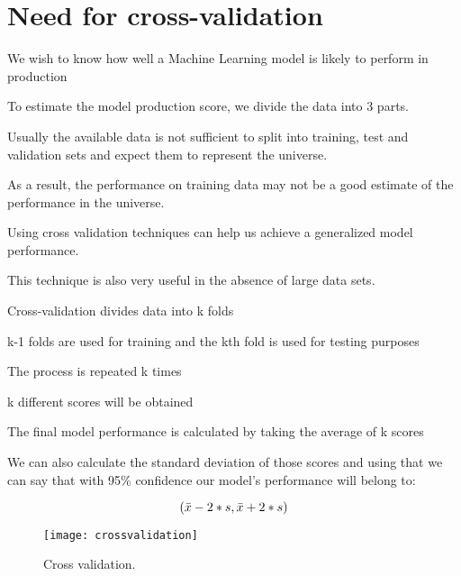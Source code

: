 	\section{Need for cross-validation}
	\begin{bulletedlist}
		\item We wish to know how well a Machine Learning model is likely to perform in production
		\item To estimate the model production score, we divide the data into 3 parts.
		\item Usually the available data is not sufficient to split into training, test and validation sets and expect them to represent the universe.
		\item As a result, the performance on training data may not be a good estimate of the performance in the universe.
		\item Using cross validation techniques can help us achieve a generalized model performance.
		\item This technique is also very useful in the absence of large data sets.
	\end{bulletedlist}

	\begin{bulletedlist}
		\item Cross-validation divides data into k folds
		\item k-1 folds are used for training and the kth fold is used for testing purposes
		\item The process is repeated k times
		\item k different scores will be obtained
		\item The final model performance is calculated by taking the average of k scores
		\item We can also calculate the standard deviation of those scores and using that we can say that with 95\% confidence our model's performance will belong to:
	\end{bulletedlist}
	\begin{equation}
		\left(\mbox{$\bar{x}$} - 2*\mbox{$s$}{}, \mbox{$\bar{x}$} + 2*\mbox{$s$}{}\right)
	\end{equation}
	\begin{figure}[h]
		\centering
		\texttt{[image: crossvalidation]}
		\caption{Cross validation.}
		\label{fig:normaldistrution}
	\end{figure}

